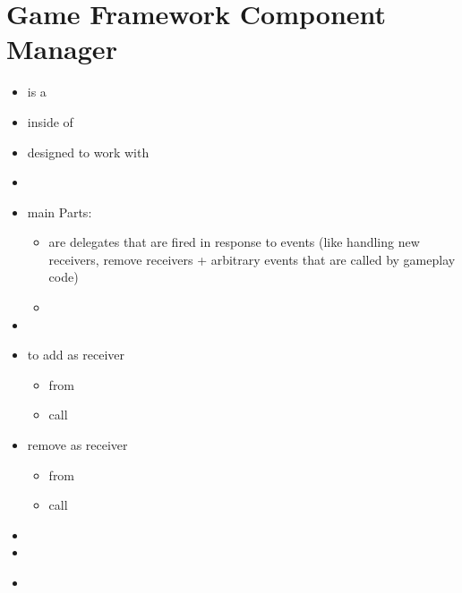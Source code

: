     \section{Game Framework Component Manager}
        \begin{itemize}
            \item is a  
            \item inside of 
            \item designed to work with 
            \item 
            \item main Parts:
            \begin{itemize}
                \item {} are delegates that are fired in response to events (like handling new receivers, remove receivers + arbitrary events that are called by gameplay code)
                \item {} 
            \end{itemize}
            \item 
            \item to add  as receiver
            \begin{itemize}
                \item from 
                \item call 
            \end{itemize} 
            \item remove  as receiver
            \begin{itemize}
                \item from 
                \item call 
            \end{itemize}
            \item 
            \item 
        \end{itemize}


        

        \uline{}
        \begin{itemize}
            \item 
        \end{itemize}
